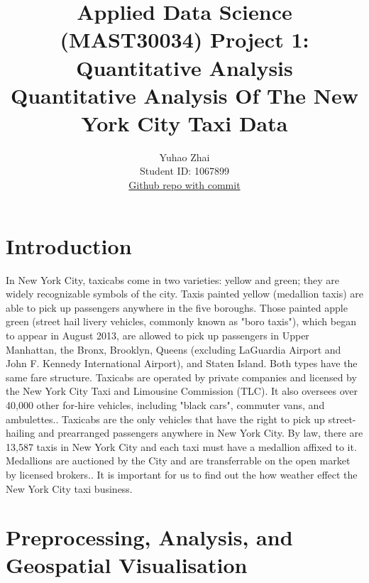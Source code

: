 \documentclass[11pt]{article}
\title{\textbf{Applied Data Science (MAST30034) Project 1: Quantitative Analysis} \\ Quantitative Analysis Of The New York City Taxi Data}
\author{
Yuhao Zhai\\
Student ID: 1067899 \\
\href{https://github.com/NimitzZ001/projectone}{Github repo with commit}
}
\begin{document}
\maketitle

\section{Introduction}

In New York City, taxicabs come in two varieties: yellow and green; they are widely recognizable symbols of the city. Taxis painted yellow (medallion taxis) are able to pick up passengers anywhere in the five boroughs. Those painted apple green (street hail livery vehicles, commonly known as "boro taxis"), which began to appear in August 2013, are allowed to pick up passengers in Upper Manhattan, the Bronx, Brooklyn, Queens (excluding LaGuardia Airport and John F. Kennedy International Airport), and Staten Island. Both types have the same fare structure. Taxicabs are operated by private companies and licensed by the New York City Taxi and Limousine Commission (TLC). It also oversees over 40,000 other for-hire vehicles, including "black cars", commuter vans, and ambulettes.\cite{Taxis}.
Taxicabs are the only vehicles that have the right to pick up street-hailing and prearranged passengers anywhere in New York City. By law, there are 13,587 taxis in New York City and each taxi must have a medallion affixed to it. Medallions are auctioned by the City and are transferrable on the open market by licensed brokers.\cite{YellowCab}. It is important for us to find out the how weather effect the New York City taxi business.  


\section{Preprocessing, Analysis, and Geospatial Visualisation}
\end{document}
